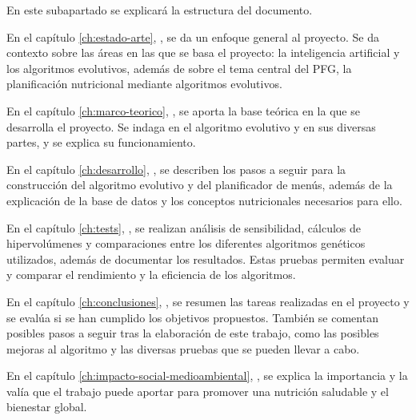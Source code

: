 En este subapartado se explicará la estructura del documento.

En el capítulo \ref{ch:estado-arte}, , se da un enfoque general al proyecto. Se da contexto sobre las áreas en las que se basa el proyecto: la inteligencia artificial y los algoritmos evolutivos, además de sobre el tema central del PFG, la planificación nutricional mediante algoritmos evolutivos.

En el capítulo \ref{ch:marco-teorico}, , se aporta la base teórica en la que se desarrolla el proyecto. Se indaga en el algoritmo evolutivo y en sus diversas partes, y se explica su funcionamiento.

En el capítulo \ref{ch:desarrollo}, , se describen los pasos a seguir para la construcción del algoritmo evolutivo y del planificador de menús, además de la explicación de la base de datos y los conceptos nutricionales necesarios para ello.

En el capítulo \ref{ch:tests}, , se realizan análisis de sensibilidad, cálculos de hipervolúmenes y comparaciones entre los diferentes algoritmos genéticos utilizados, además de documentar los resultados. Estas pruebas permiten evaluar y comparar el rendimiento y la eficiencia de los algoritmos.

En el capítulo \ref{ch:conclusiones}, , se resumen las tareas realizadas en el proyecto y se evalúa si se han cumplido los objetivos propuestos. También se comentan posibles pasos a seguir tras la elaboración de este trabajo, como las posibles mejoras al algoritmo y las diversas pruebas que se pueden llevar a cabo.

En el capítulo \ref{ch:impacto-social-medioambiental}, , se explica la importancia y la valía que el trabajo puede aportar para promover una nutrición saludable y el bienestar global. 